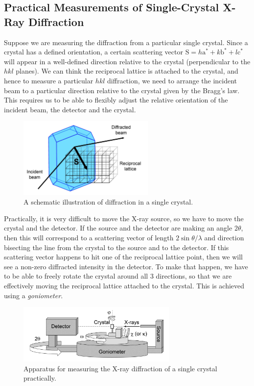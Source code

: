 \documentclass{article}
\theoremstyle{plain}\theoremheaderfont{\normalfont\itshape}\theorembodyfont{\rmfamily}\theoremseparator{.}\newtheorem*{rem}{Remark}\newtheorem*{ex}{Example}\newtheorem*{proof}{Proof}\newtheorem*{altp}{Alternative proof}
\theoremstyle{plain}\theoremheaderfont{\normalfont\bfseries}\theorembodyfont{\rmfamily}\theoremseparator{.}\newtheorem{thm}{Theorem}[section]\newtheorem{lem}[thm]{Lemma}\newtheorem{prop}[thm]{Proposition}\newtheorem*{cor}{Corollary}\newtheorem{defn}[thm]{Definition}\newtheorem{clm}[thm]{Claim}\newtheorem{clminproof}{Claim}\newtheorem*{law}{Law}\newtheorem{pos}[thm]{Postulate}
\theoremstyle{break}\theoremheaderfont{\normalfont\itshape}\theorembodyfont{\rmfamily}\theoremseparator{.\medskip}\newtheorem*{proofskip}{Proof}\newtheorem*{exs}{Examples}\newtheorem*{rems}{Remarks}
\theoremstyle{break}\theoremheaderfont{\normalfont\bfseries}\theorembodyfont{\rmfamily}\theoremseparator{.\medskip}\newtheorem{lemskip}[thm]{Lemma}\newtheorem{defnskip}[thm]{Definition}\newtheorem{propskip}[thm]{Proposition}\newtheorem{thmskip}[thm]{Theorem}
\numberwithin{equation}{section}
\newcommand{\vb}[1]{\bm{\mathrm{#1}}}
\begin{document}
    \subsection{Practical Measurements of Single-Crystal X-Ray Diffraction}
    Suppose we are measuring the diffraction from a particular single crystal. Since a crystal has a defined orientation, a certain scattering vector \(\vb{S}=h\vb{a}^*+k\vb{b}^*+l\vb{c}^*\) will appear in a well-defined direction relative to the crystal (perpendicular to the \(hkl\) planes). We can think the reciprocal lattice is attached to the crystal, and hence to measure a particular \(hkl\) diffraction, we need to arrange the incident beam to a particular direction relative to the crystal given by the Bragg's law. This requires us to be able to flexibly adjust the relative orientation of the incident beam, the detector and the crystal.
    \begin{figure}[ht!]
        \centering
        \includegraphics[width=0.6\textwidth]{Single_crystal_diffraction.jpg}
        \caption{A schematic illustration of diffraction in a single crystal.}
    \end{figure}
    
    Practically, it is very difficult to move the X-ray source, so we have to move the crystal and the detector. If the source and the detector are making an angle \(2\theta\), then this will correspond to a scattering vector of length \(2\sin\theta/\lambda\) and direction bisecting the line from the crystal to the source and to the detector. If this scattering vector happens to hit one of the reciprocal lattice point, then we will see a non-zero diffracted intensity in the detector. To make that happen, we have to be able to freely rotate the crystal around all 3 directions, so that we are effectively moving the reciprocal lattice attached to the crystal. This is achieved using a \textit{goniometer}.

    \begin{figure}
        \centering
        \includegraphics[width=0.7\textwidth]{XRD_apparatus.jpg}
        \caption{Apparatus for measuring the X-ray diffraction of a single crystal practically.}
    \end{figure}
\end{document}
